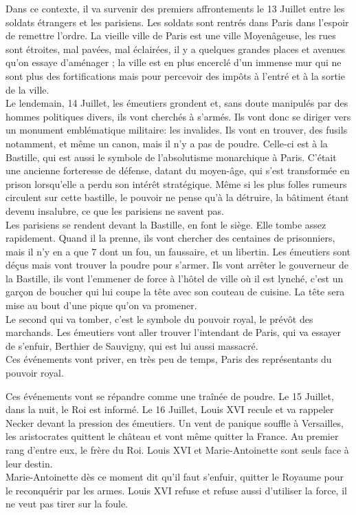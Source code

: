 \documentclass[10pt, a4paper, openany]{book}
\begin{document}
Dans ce contexte, il va survenir des premiers affrontements le 13 Juillet entre les soldats étrangers et les parisiens. Les soldats sont rentrés dans Paris dans l'espoir de remettre l'ordre. La vieille ville de Paris est une ville Moyenâgeuse, les rues sont étroites, mal pavées, mal éclairées, il y a quelques grandes places et avenues qu'on essaye d'aménager ; la ville est en plus encerclé d'un immense mur qui ne sont plus des fortifications mais pour percevoir des impôts à l'entré et à la sortie de la ville. \\
Le lendemain, 14 Juillet, les émeutiers grondent et, sans doute manipulés par des hommes politiques divers, ils vont cherchés à s'armés. Ils vont donc se diriger vers un monument emblématique militaire: les invalides. Ils vont en trouver, des fusils notamment, et même un canon, mais il n'y a pas de poudre. Celle-ci est à la Bastille, qui est aussi le symbole de l'absolutisme monarchique à Paris. C'était une ancienne forteresse de défense, datant du moyen-âge, qui s'est transformée en prison lorsqu'elle a perdu son intérêt stratégique. Même si les plus folles rumeurs circulent sur cette bastille, le pouvoir ne pense qu'à la détruire, la bâtiment étant devenu insalubre, ce que les parisiens ne savent pas. \\
Les parisiens se rendent devant la Bastille, en font le siège. Elle tombe assez rapidement. Quand il la prenne, ils vont chercher des centaines de prisonniers, mais il n'y en a que 7 dont un fou, un faussaire, et un libertin. Les émeutiers sont déçus mais vont trouver la poudre pour s'armer. Ils vont arrêter le gouverneur de la Bastille, ils vont l'emmener de force à l'hôtel de ville où il est lynché, c'est un garçon de boucher qui lui coupe la tête avec son couteau de cuisine. La tête sera mise au bout d'une pique qu'on va promener. \\
Le second qui va tomber, c'est le symbole du pouvoir royal, le prévôt des marchands. Les émeutiers vont aller trouver l'intendant de Paris, qui va essayer de s'enfuir, Berthier de Sauvigny, qui est lui aussi massacré. \\
Ces événements vont priver, en très peu de temps, Paris des représentants du pouvoir royal.


Ces événements vont se répandre comme une traînée de poudre. Le 15 Juillet, dans la nuit, le Roi est informé. Le 16 Juillet, Louis XVI recule et va rappeler Necker devant la pression des émeutiers. Un vent de panique souffle à Versailles, les aristocrates quittent le château et vont même quitter la France. Au premier rang d'entre eux, le frère du Roi. Louis XVI et Marie-Antoinette sont seuls face à leur destin. \\
Marie-Antoinette dès ce moment dit qu'il faut s'enfuir, quitter le Royaume pour le reconquérir par les armes. Louis XVI refuse et refuse aussi d'utiliser la force, il ne veut pas tirer sur la foule.
\end{document}

